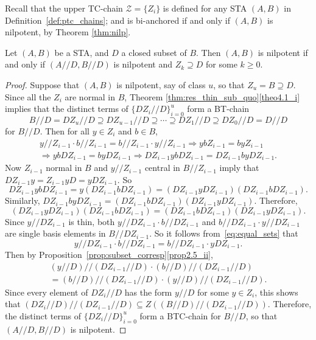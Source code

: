 \documentclass[ALCO,ThmDefs,Unicode,epreuves]{cedram}
\begin{document}
Recall that the upper TC-chain $\mathcal{Z} = \{Z_i\}$ is
defined for any STA $(A, B)$ in Definition~\ref{def:ptc_chains}; and is
bi-anchored if and only if $(A, B)$ is nilpotent, by Theorem
\ref{thm:nilp}.
 
\begin{thm}
\label{thm:quotient_nilp}
Let $(A, B)$ be a STA, and $D$ a closed subset of $B$. Then $(A,
B)$ is nilpotent if and only if $(A//D, B//D)$ is nilpotent and $Z_k
\supseteq D$ for some $k \geq 0$.
\end{thm}

\begin{proof}
Suppose that $(A, B)$ is nilpotent, say of class $u$, so that $Z_u = B
\supseteq D$. Since all the $Z_i$ are normal in $B$, Theorem 
\ref{thm:res_thin_sub_quo}\ref{theo4.1_i} implies that the distinct terms of
$\{DZ_i//D\}_{i=0}^u$
form a BT-chain
\[
B//D = DZ_u//D \supseteq DZ_{u-1}//D \supseteq \cdots \supseteq
DZ_1//D \supseteq DZ_0//D = D//D
\]
for $B//D$. Then for all $y \in Z_i$ and $b \in B$,
\begin{multline*}
y//Z_{i-1}\cdot b//Z_{i-1} = b//Z_{i-1}\cdot y//Z_{i-1} \Rightarrow
 ybZ_{i-1} = byZ_{i-1}
\\
\Rightarrow ybDZ_{i-1} = byDZ_{i-1}
 \Rightarrow DZ_{i-1}ybDZ_{i-1} = DZ_{i-1}byDZ_{i-1}.
\end{multline*} 
Now $Z_{i-1}$ normal in $B$ and $y//Z_{i-1}$ central in $B//Z_{i-1}$ imply
that $DZ_{i-1}y = Z_{i-1}yD = yDZ_{i-1}$. So
\[
DZ_{i-1}ybDZ_{i-1} = y(DZ_{i-1}bDZ_{i-1}) = 
(DZ_{i-1}yDZ_{i-1})(DZ_{i-1}bDZ_{i-1}).
\]
Similarly, $DZ_{i-1}byDZ_{i-1} = (DZ_{i-1}bDZ_{i-1})(DZ_{i-1}yDZ_{i-1})$.
Therefore,
\begin{equation} 
\label{eq:equal_sets} 
(DZ_{i-1}yDZ_{i-1})(DZ_{i-1}bDZ_{i-1}) = 
(DZ_{i-1}bDZ_{i-1})(DZ_{i-1}yDZ_{i-1}).
\end{equation}
Since $y//DZ_{i-1}$ is thin, both $y//DZ_{i-1}\cdot b//DZ_{i-1}$ and
$b//DZ_{i-1}\cdot y//DZ_{i-1}$ are single basis elements in
$B//DZ_{i-1}$. So it follows from~\eqref{eq:equal_sets} that
\[
y//DZ_{i-1}\cdot b//DZ_{i-1} = b//DZ_{i-1}\cdot yDZ_{i-1}.
\] 
Then by Proposition~\ref{prop:subset_corresp}\ref{prop2.5_ii}, 
\begin{multline*}
(y//D)//(DZ_{i-1}//D)\cdot (b//D)//(DZ_{i-1}//D) 
\\
= (b//D)//(DZ_{i-1}//D)\cdot (y//D)//(DZ_{i-1}//D).
\end{multline*}
Since every element of $DZ_{i}//D$ has the form $y//D$ for some $y \in
Z_i$, this shows that $(DZ_i//D)//(DZ_{i-1}//D) \subseteq Z((B//D)//(DZ_{i-1}//D))$.
Therefore, the distinct terms of $\{DZ_i//D\}_{i=0}^u$ form a BTC-chain
for $B//D$, so that $(A//D, B//D)$ is nilpotent.


\end{proof}
\end{document}
